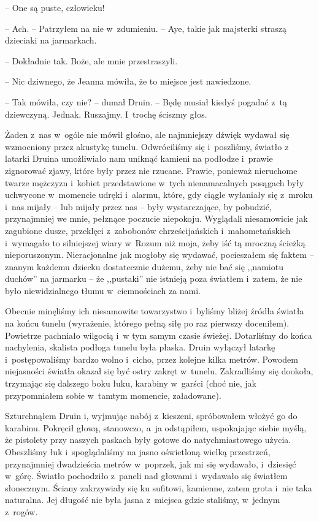 \documentclass[oneside,polish,11pt,sfheadings]{mwbk}
\begin{document}
-- One są puste, człowieku!

-- Ach. -- Patrzyłem na nie w~zdumieniu. -- Aye, takie jak majsterki
straszą dzieciaki na jarmarkach.

-- Dokładnie tak. Boże, ale mnie przestraszyli.

-- Nic dziwnego, że Jeanna mówiła, że to miejsce jest nawiedzone.

-- Tak mówiła, czy nie? -- dumał Druin. -- Będę musiał kiedyś pogadać z~tą
dziewczyną. Jednak. Ruszajmy. I~trochę ściszmy głos.

Żaden z~nas w~ogóle nie mówił głośno, ale najmniejszy dźwięk wydawał się
wzmocniony przez akustykę tunelu. Odwróciliśmy się i~poszliśmy, światło
z latarki Druina umożliwiało nam uniknąć kamieni na podłodze i~prawie
zignorować zjawy, które były przez nie rzucane. Prawie, ponieważ
nieruchome twarze mężczyzn i~kobiet przedstawione w~tych nienamacalnych
posągach były uchwycone w~momencie udręki i~alarmu, które, gdy ciągle
wyłaniały się z~mroku i~nas mijały -- lub mijały przez nas -- były
wystarczające, by pobudzić, przynajmniej we mnie, pełznące poczucie
niepokoju. Wyglądali niesamowicie jak zagubione dusze, przeklęci z~zabobonów chrześcijańskich i~mahometańskich i~wymagało to silniejszej
wiary w~Rozum niż moja, żeby iść tą mroczną ścieżką nieporuszonym.
Nieracjonalne jak mogłoby się wydawać, pocieszałem się faktem -- znanym
każdemu dziecku dostatecznie dużemu, żeby nie bać się ,,namiotu duchów''
na jarmarku -- że ,,pustaki'' nie istnieją poza światłem i~zatem, że nie
było niewidzialnego tłumu w~ciemnościach za nami.

Obecnie minęliśmy ich niesamowite towarzystwo i~byliśmy bliżej źródła
światła na końcu tunelu (wyrażenie, którego pełną siłę po raz pierwszy
doceniłem). Powietrze pachniało wilgocią i~w tym samym czasie świeżej.
Dotarliśmy do końca nachylenia, skalista podłoga tunelu była płaska.
Druin wyłączył latarkę i~postępowaliśmy bardzo wolno i~cicho, przez
kolejne kilka metrów. Powodem niejasności światła okazał się być ostry
zakręt w~tunelu. Zakradliśmy się dookoła, trzymając się dalszego boku
łuku, karabiny w~garści (choć nie, jak przypomniałem sobie w~tamtym
momencie, załadowane).

Szturchnąłem Druin i, wyjmując nabój z~kieszeni, spróbowałem włożyć go
do karabinu. Pokręcił głową, stanowczo, a~ja odstąpiłem, uspokajając
siebie myślą, że pistolety przy naszych paskach były gotowe do
natychmiastowego użycia. Obeszliśmy łuk i~spoglądaliśmy na jasno
oświetloną wielką przestrzeń, przynajmniej dwadzieścia metrów w~poprzek,
jak mi się wydawało, i~dziesięć w~górę. Światło pochodziło z~paneli nad
głowami i~wydawało się światłem słonecznym. Ściany zakrzywiały się ku
sufitowi, kamienne, zatem grota i~nie taka naturalna. Jej długość nie
była jasna z~miejsca gdzie staliśmy, w~jednym z~rogów.
\end{document}
